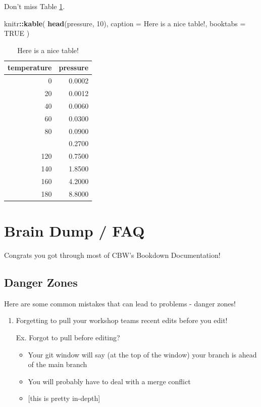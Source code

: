 \documentclass[
]{book}
\newenvironment{Shaded}{\begin{snugshade}}{\end{snugshade}}
\newcommand{\AttributeTok}[1]{\textcolor[rgb]{0.13,0.29,0.53}{#1}}
\newcommand{\ConstantTok}[1]{\textcolor[rgb]{0.56,0.35,0.01}{#1}}
\newcommand{\DecValTok}[1]{\textcolor[rgb]{0.00,0.00,0.81}{#1}}
\newcommand{\FunctionTok}[1]{\textcolor[rgb]{0.13,0.29,0.53}{\textbf{#1}}}
\newcommand{\NormalTok}[1]{#1}
\newcommand{\SpecialCharTok}[1]{\textcolor[rgb]{0.81,0.36,0.00}{\textbf{#1}}}
\newcommand{\StringTok}[1]{\textcolor[rgb]{0.31,0.60,0.02}{#1}}
\providecommand{\tightlist}{%
  \setlength{\itemsep}{0pt}\setlength{\parskip}{0pt}}
\theoremstyle{definition}
\theoremstyle{definition}
\theoremstyle{definition}
\theoremstyle{definition}
\theoremstyle{remark}
\begin{document}
Don't miss Table \ref{tab:nice-tab}.

\begin{Shaded}
\begin{Highlighting}[]
\NormalTok{knitr}\SpecialCharTok{::}\FunctionTok{kable}\NormalTok{(}
  \FunctionTok{head}\NormalTok{(pressure, }\DecValTok{10}\NormalTok{), }\AttributeTok{caption =} \StringTok{\textquotesingle{}Here is a nice table!\textquotesingle{}}\NormalTok{,}
  \AttributeTok{booktabs =} \ConstantTok{TRUE}
\NormalTok{)}
\end{Highlighting}
\end{Shaded}

\begin{table}

\caption{\label{tab:nice-tab}Here is a nice table!}
\centering
\begin{tabular}[t]{rr}
\toprule
temperature & pressure\\
\midrule
0 & 0.0002\\
20 & 0.0012\\
40 & 0.0060\\
60 & 0.0300\\
80 & 0.0900\\
\addlinespace
100 & 0.2700\\
120 & 0.7500\\
140 & 1.8500\\
160 & 4.2000\\
180 & 8.8000\\
\bottomrule
\end{tabular}
\end{table}

\chapter{Brain Dump / FAQ}\label{help}

Congrats you got through most of CBW's Bookdown Documentation!

\section{Danger Zones}\label{danger-zones}

Here are some common mistakes that can lead to problems - danger zones!

\begin{enumerate}
\def\labelenumi{\arabic{enumi}.}
\item
  Forgetting to pull your workshop teams recent edits before you edit!

  Ex. Forgot to pull before editing?

  \begin{itemize}
  \tightlist
  \item
    Your git window will say (at the top of the window) your branch is ahead of the main branch
  \item
    You will probably have to deal with a merge conflict
  \item
    {[}this is pretty in-depth{]}
  \end{itemize}
\end{enumerate}
\end{document}
